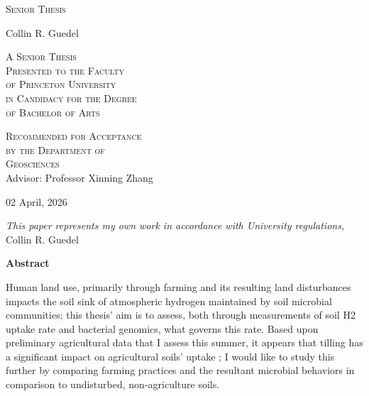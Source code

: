\documentclass[11pt]{report}
\begin{document}

\thispagestyle{empty}
  \begin{center}
    \textsc{\LARGE Senior Thesis} %
  \end{center}
  \vspace{.6in}
  \begin{center}
    Collin R. Guedel
  \end{center}
  \vspace{.6in}
  \begin{center}
    \textsc{A Senior Thesis \\ %
    Presented to the Faculty \\
    of Princeton University \\
    in Candidacy for the Degree \\
    of Bachelor of Arts}
  \end{center}
  \vspace{.3in}
  \begin{center}
    \textsc{Recommended for Acceptance \\
    by the Department of \\
    Geosciences \\}
    Advisor: Professor Xinning Zhang %
  \end{center}
  \vspace{.3in}
  \begin{center}
    02 April, 2026 %
  \end{center}
  
  \clearpage

\thispagestyle{empty}
\vspace*{3in}
\begin{center}
\emph{This paper represents my own work in accordance with University regulations,} \\
Collin R. Guedel
\end{center}
\clearpage

{}
\begin{center}
\Large \textbf{Abstract}
\end{center}
 Human land use, primarily through farming and its resulting land disturbances impacts the soil sink of atmospheric hydrogen maintained by soil microbial communities; this thesis' aim is to assess, both through measurements of soil H2 uptake rate and bacterial genomics, what governs this rate. Based upon preliminary agricultural data that I assess this summer, it appears that tilling has a significant impact on agricultural soils' uptake ; I would like to study this further by comparing farming practices and the resultant microbial behaviors in comparison to undisturbed, non-agriculture soils.
 \clearpage
\end{document}
